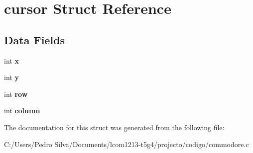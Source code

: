 \hypertarget{structcursor}{\section{cursor Struct Reference}
\label{structcursor}
}
\subsection*{Data Fields}
\begin{DoxyCompactItemize}
\item 
\hypertarget{structcursor_a6150e0515f7202e2fb518f7206ed97dc}{int {\bfseries x}}\label{structcursor_a6150e0515f7202e2fb518f7206ed97dc}

\item 
\hypertarget{structcursor_a0a2f84ed7838f07779ae24c5a9086d33}{int {\bfseries y}}\label{structcursor_a0a2f84ed7838f07779ae24c5a9086d33}

\item 
\hypertarget{structcursor_af1d3cff2e4538e23400e260bae3dadad}{int {\bfseries row}}\label{structcursor_af1d3cff2e4538e23400e260bae3dadad}

\item 
\hypertarget{structcursor_a60dae4c6e78188cd718b696e4f08fc71}{int {\bfseries column}}\label{structcursor_a60dae4c6e78188cd718b696e4f08fc71}

\end{DoxyCompactItemize}


The documentation for this struct was generated from the following file\-:\begin{DoxyCompactItemize}
\item 
C\-:/\-Users/\-Pedro Silva/\-Documents/lcom1213-\/t5g4/projecto/codigo/commodore.\-c\end{DoxyCompactItemize}
